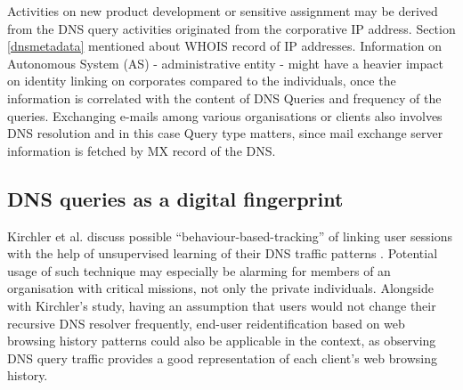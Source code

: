 Activities on new product development or sensitive assignment may be derived from the DNS query activities originated from the corporative IP address. Section \ref{dnsmetadata} mentioned about WHOIS record of IP addresses. Information on Autonomous System (AS) - administrative entity - might have a heavier impact on identity linking on corporates compared to the individuals, once the information is correlated with the content of DNS Queries and frequency of the queries. Exchanging e-mails among various organisations or clients also involves DNS resolution and in this case Query type matters, since mail exchange server information is fetched by MX record of the DNS.

\subsection{DNS queries as a digital fingerprint}
Kirchler et al. discuss possible ``behaviour-based-tracking'' of linking user sessions with the help of unsupervised learning of their DNS traffic patterns \cite{kirchler2016tracked}. Potential usage of such technique may especially be alarming for members of an organisation with critical missions, not only the private individuals.
Alongside with Kirchler's study, having an assumption that users would not change their recursive DNS resolver frequently, end-user reidentification based on web browsing history patterns \cite{olejnik2012johnny} could also be applicable in the context, as observing DNS query traffic provides a good representation of each client's web browsing history.